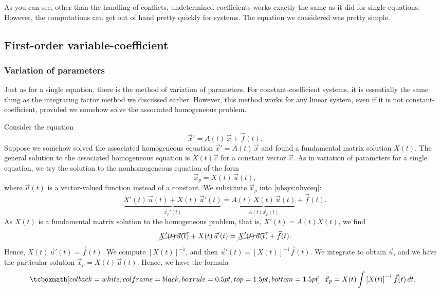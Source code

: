 As you can see, other than the handling of conflicts, undetermined
coefficients works exactly the same as it did for
single equations.  However, the computations can get out of hand pretty
quickly for systems.  The equation we considered was pretty simple.

\subsection{First-order variable-coefficient}

\subsubsection{Variation of parameters}

Just as for a single equation, there is the method of
variation of parameters.
For constant-coefficient systems, it is essentially
the same thing as the integrating factor method we discussed earlier.
However, this method works for any linear system, even if it is not
constant-coefficient, provided we somehow solve the associated
homogeneous problem.

Consider the equation
\begin{equation} \label{nhsys:nhvceq}
{\vec{x}}' = A(t) \, \vec{x} + \vec{f}(t) .
\end{equation}
Suppose we somehow solved the associated homogeneous equation
${\vec{x}}' = A(t) \, \vec{x}$ and found
a fundamental matrix solution
$X(t)$.  The general solution to the associated homogeneous equation
is $X(t) \vec{c}$ for a constant vector $\vec{c}$.  As in
variation of parameters for a single equation, we try the solution
to the nonhomogeneous equation of the form
\begin{equation*}
\vec{x}_p = X(t)\, \vec{u}(t) ,
\end{equation*}
where $\vec{u}(t)$ is a vector-valued function instead of a constant.
We substitute $\vec{x}_p$ into \eqref{nhsys:nhvceq}:
\begin{equation*}
\underbrace{X'(t)\, \vec{u}(t) + X(t)\, {\vec{u}}'(t)}%
_{{\vec{x}_p}'(t)}
=
\underbrace{A(t)\, X(t)\, \vec{u}(t)}%
_{A(t) \vec{x}_p (t)} 
 + \vec{f}(t) .
\end{equation*}
As $X(t)$ is a fundamental matrix solution to the homogeneous problem,
that is,
$X'(t) = A(t)X(t)$, we find
\begin{equation*}
\cancel{X'(t)\, \vec{u}(t)} + X(t)\, {\vec{u}}'(t)
=
\cancel{X'(t)\, \vec{u}(t)} + \vec{f}(t) .
\end{equation*}
Hence,
$X(t)\, {\vec{u}}'(t) = \vec{f}(t)$.  We compute
$\left[X(t)\right]^{-1}$,
and then
${\vec{u}}'(t) = \left[X(t)\right]^{-1}\vec{f}(t)$.  We integrate
to obtain $\vec{u}$, and we have the particular solution
$\vec{x}_p = X(t)\, \vec{u}(t)$.
Hence, we have the formula
\begin{equation*}
\mybxbg{~~
\vec{x}_p = 
X(t)
\int \left[X(t)\right]^{-1}\vec{f}(t) \, dt .
~~}
\end{equation*}

